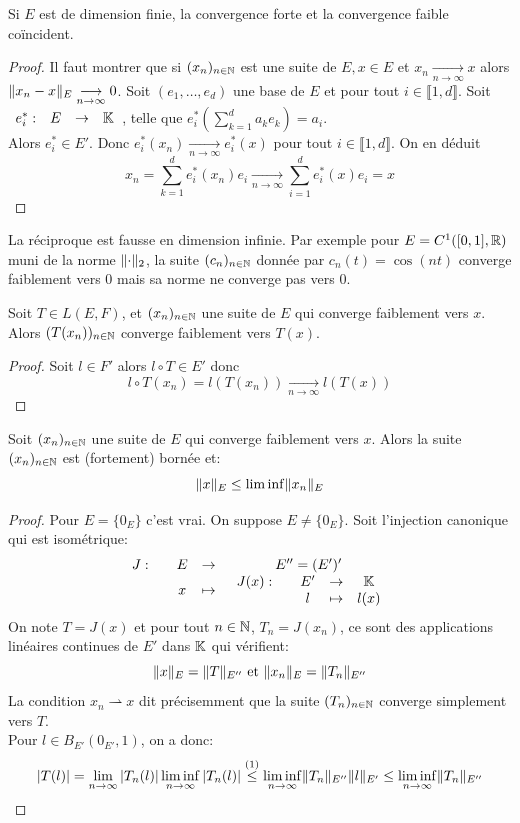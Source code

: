 \documentclass[]{report}
\begin{document}
    \begin{prop}{}{}
        Si $E$ est de dimension finie, la convergence forte et la convergence faible coïncident.
    \end{prop}
    
    \begin{proof}
        Il faut montrer que si $(x_n)_{n\in\mathbb{N}}$ est une suite de $E,x\in E$ et $x_n\underset{n\to \infty}{\longrightarrow} x$ alors $\lVert x_n-x \rVert_E\underset{n\to \infty}{\longrightarrow} 0$. Soit $(e_1,\ldots,e_d)$ une base de $E$ et pour tout $i\in \llbracket 1,d\rrbracket$. Soit $\begin{array}{ccccc} e_i^* : & E & \to & \mathbb{K} \end{array}$, telle que $e_i^*(\sum_{k=1}^{d}a_k e_k)=a_i$.\\
        Alors $e_i^*\in E'$. Donc $e_i^*(x_n)\underset{n\to \infty}{\longrightarrow} e_i^*(x)$ pour tout $i\in \llbracket 1,d \rrbracket$. On en déduit
        \[x_n=\sum_{k=1}^{d}e_i^*(x_n)e_i\underset{n\to \infty}{\longrightarrow} \sum_{i=1}^{d}e_i^*(x)e_i=x\]
    \end{proof}

    \begin{re}{}{}
        La réciproque est fausse en dimension infinie. Par exemple pour $E=C^1([0,1],\mathbb{R})$ muni de la norme $\lVert \cdot \rVert_{2}$, la suite $(c_n)_{n\in\mathbb{N}}$ donnée par $c_n(t)=\cos(nt)$ converge faiblement vers $0$ mais sa norme ne converge pas vers $0$.
    \end{re}

    \begin{prop}{}{}
        Soit $T\in L(E,F)$, et $(x_n)_{n\in\mathbb{N}}$ une suite de $E$ qui converge faiblement vers $x$. Alors $(T(x_n))_{n\in\mathbb{N}}$ converge faiblement vers $T(x)$.
    \end{prop}

    \begin{proof}
        Soit $l\in F'$ alors $l\circ T\in E'$ donc
        \[l\circ T(x_n)=l(T(x_n))\underset{n\to\infty}{\longrightarrow}l(T(x))\]
    \end{proof}

    \begin{prop}{}{}
        Soit $(x_n)_{n\in\mathbb{N}}$ une suite de $E$ qui converge faiblement vers $x$. Alors la suite $(x_n)_{n\in\mathbb{N}}$ est (fortement) bornée et:
        \[\lVert x \rVert_E \le \liminf \lVert x_n \rVert_E\]
    \end{prop}

    \begin{proof}
        Pour $E=\{0_E\}$ c'est vrai. On suppose $E\neq \{0_E\}$. Soit l'injection canonique qui est isométrique:
        \[\begin{array}{ccccc} J : & & E & \to & E''=(E')' \\ & & x & \mapsto & \begin{array}{ccccc} J(x) : & & E' & \to & \mathbb{K} \\ & & l & \mapsto & l(x) \end{array} \end{array}\]
        On note $T=J(x)$ et pour tout $n\in \mathbb{N}$, $T_n=J(x_n)$, ce sont des applications linéaires continues de $E'$ dans $\mathbb{K}$ qui vérifient:
        \[\lVert x \rVert_E=\lVert T \rVert_{E''}\text{ et }\lVert x_n \rVert_E =\lVert T_n \rVert_{E''}\]
        La condition $x_n\rightharpoonup x$ dit précisemment que la suite $(T_n)_{n\in\mathbb{N}}$ converge simplement vers $T$.\\
        Pour $l\in B_{E'}(0_{E'},1)$, on a donc:
        \[\left|T(l)\right|=\lim_{n\to \infty}\left|T_n(l)\right|\liminf_{n\to \infty} \left|T_n(l)\right|\overset{(1)}{\le} \liminf_{n\to \infty} \lVert T_n \rVert_{E''}\lVert l \rVert_{E'}\le \liminf_{n\to\infty} \lVert T_n \rVert_{E''}\]
    \end{proof}
\end{document}
